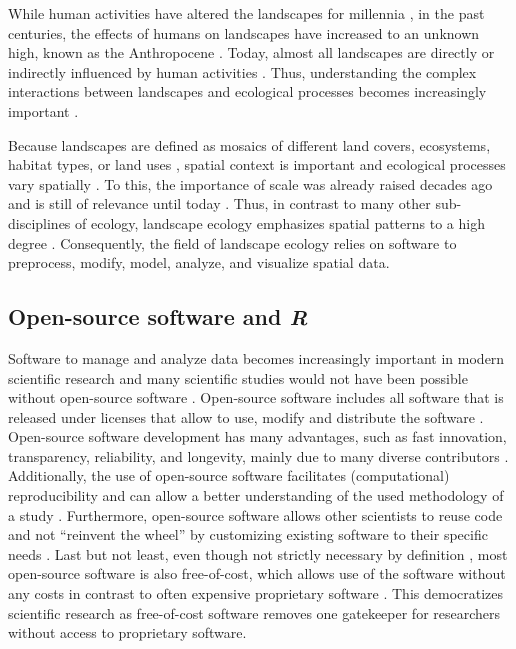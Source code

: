 \documentclass[smallextended]{svjour3}       %
\begin{document}
While human activities have altered the landscapes for millennia \cite{Ellis2011,Ellis2015}, in the past centuries, the effects of humans on landscapes have increased to an unknown high, known as the Anthropocene \cite{Crutzen2002}.
Today, almost all landscapes are directly or indirectly influenced by human activities \cite{Vitousek1997}.
Thus, understanding the complex interactions between landscapes and ecological processes becomes increasingly important \cite{With2019}.

Because landscapes are defined as mosaics of different land covers, ecosystems, habitat types, or land uses \cite{Forman1986,Forman1995,Wiens1995}, spatial context is important and ecological processes vary spatially \cite{With2019}.
To this, the importance of scale was already raised decades ago \cite{Wiens1989,Levin1992,Jelinski1996} and is still of relevance until today \cite{Simova2012,Estes2018}.
Thus, in contrast to many other sub-disciplines of ecology, landscape ecology emphasizes spatial patterns to a high degree \cite{Risser1984}.
Consequently, the field of landscape ecology relies on software to preprocess, modify, model, analyze, and visualize spatial data.

\hypertarget{sec:open_source}{%
\subsection{\texorpdfstring{Open-source software and \emph{R}}{Open-source software and R}}\label{sec:open_source}}

Software to manage and analyze data becomes increasingly important in modern scientific research \cite{Wilson2014} and many scientific studies would not have been possible without open-source software \cite{Prlic2012}.
Open-source software includes all software that is released under licenses that allow to use, modify and distribute the software \cite{St.Laurent2008}.
Open-source software development has many advantages, such as fast innovation, transparency, reliability, and longevity, mainly due to many diverse contributors \cite{vonKrogh2006,St.Laurent2008}.
Additionally, the use of open-source software facilitates (computational) reproducibility and can allow a better understanding of the used methodology of a study \cite{Prlic2012,Powers2019}.
Furthermore, open-source software allows other scientists to reuse code and not ``reinvent the wheel'' \cite{Prlic2012} by customizing existing software to their specific needs \cite{Steiniger2009}.
Last but not least, even though not strictly necessary by definition \cite{Steiniger2009,Steiniger2009a}, most open-source software is also free-of-cost, which allows use of the software without any costs in contrast to often expensive proprietary software \cite{vonKrogh2006,Steiniger2009,Steiniger2009a}.
This democratizes scientific research as free-of-cost software removes one gatekeeper for researchers without access to proprietary software.
\end{document}
